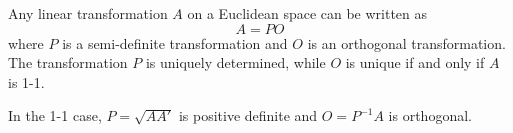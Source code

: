 Any linear transformation $A$ on a Euclidean space can be written as
$$A = PO$$
where $P$ is a semi-definite transformation and $O$ is an orthogonal transformation. The transformation $P$ is uniquely determined, while $O$ is unique if and only if $A$ is 1-1.

In the 1-1 case, $P = \sqrt{AA'}$ is positive definite and $O = P^{-1}A$ is orthogonal.
